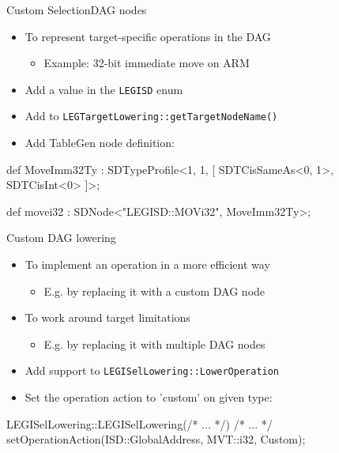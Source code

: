 
\begin{frame}[fragile]{Custom SelectionDAG nodes}

\begin{itemize}
    \item To represent target-specific operations in the DAG
    \begin{itemize}
        \item Example: 32-bit immediate move on ARM
    \end{itemize}
    \item Add a value in the \texttt{LEGISD} enum
    \item Add to \texttt{LEGTargetLowering::getTargetNodeName()}
    \item Add TableGen node definition:
\end{itemize}

\begin{codebox}
def MoveImm32Ty : SDTypeProfile<1, 1, [
  SDTCisSameAs<0, 1>, SDTCisInt<0>
]>;

def movei32 : SDNode<"LEGISD::MOVi32", MoveImm32Ty>;
\end{codebox}

\end{frame}


\begin{frame}[fragile]{Custom DAG lowering}

\begin{itemize}
    \item To implement an operation in a more efficient way
    \begin{itemize}
        \item E.g. by replacing it with a custom DAG node
    \end{itemize}
    \item To work around target limitations
    \begin{itemize}
        \item E.g. by replacing it with multiple DAG nodes
    \end{itemize}
    \item Add support to \texttt{LEGISelLowering::LowerOperation}
    \item Set the operation action to 'custom' on given type:
\end{itemize}

\begin{codebox}
LEGISelLowering::LEGISelLowering(/* ... */) {
  /* ... */
  setOperationAction(ISD::GlobalAddress, MVT::i32, Custom);
}
\end{codebox}

\end{frame}


